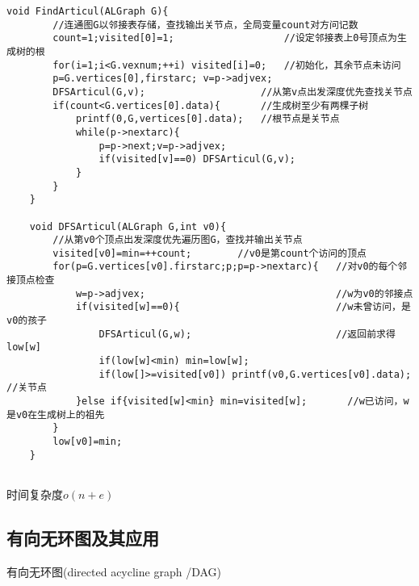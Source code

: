 \documentclass[UTF8]{ctexart}
\begin{document}
\begin{lstlisting}[style=v1]
    void FindArticul(ALGraph G){
        //连通图G以邻接表存储，查找输出关节点，全局变量count对方问记数
        count=1;visited[0]=1;                   //设定邻接表上0号顶点为生成树的根  
        for(i=1;i<G.vexnum;++i) visited[i]=0;   //初始化，其余节点未访问
        p=G.vertices[0],firstarc; v=p->adjvex;  
        DFSArticul(G,v);                    //从第v点出发深度优先查找关节点
        if(count<G.vertices[0].data){       //生成树至少有两棵子树
            printf(0,G,vertices[0].data);   //根节点是关节点
            while(p->nextarc){
                p=p->next;v=p->adjvex;
                if(visited[v]==0) DFSArticul(G,v);
            }
        }
    }

    void DFSArticul(ALGraph G,int v0){
        //从第v0个顶点出发深度优先遍历图G，查找并输出关节点
        visited[v0]=min=++count;        //v0是第count个访问的顶点
        for(p=G.vertices[v0].firstarc;p;p=p->nextarc){   //对v0的每个邻接顶点检查
            w=p->adjvex;                                 //w为v0的邻接点
            if(visited[w]==0){                           //w未曾访问，是v0的孩子   
                DFSArticul(G,w);                         //返回前求得low[w]   
                if(low[w]<min) min=low[w];
                if(low[]>=visited[v0]) printf(v0,G.vertices[v0].data);  //关节点
            }else if{visited[w]<min} min=visited[w];       //w已访问，w是v0在生成树上的祖先 
        }
        low[v0]=min;
    }
 
\end{lstlisting}

时间复杂度$o(n+e)$

\subsection{有向无环图及其应用}
有向无环图(directed acycline graph /DAG)
\end{document}
